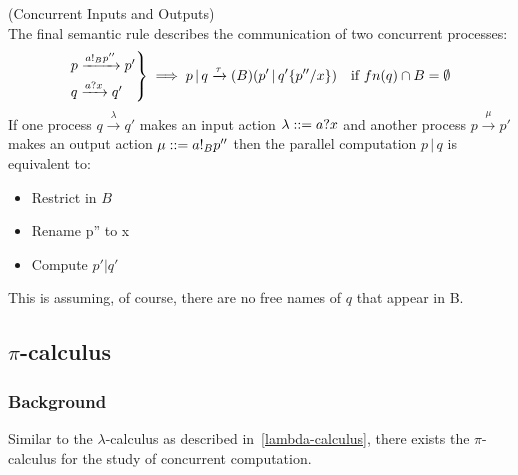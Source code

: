 \documentclass{article}
\begin{document}
        \begin{definition}{(Concurrent Inputs and Outputs)\\}
            The final semantic rule describes the communication of two concurrent processes:
            \begin{align}
                \begin{rcases}
                    p \xrightarrow{a!_{B} p''} p' \\
                    q \xrightarrow{a? x} q' \\
                \end{rcases}
                \implies p \, | \, q \xrightarrow{\tau} (B)(p' \, | \, q'\{p'' / x\}) \quad\text{if } fn(q) \cap B = \emptyset
            \end{align}
            If one process $q \xrightarrow{\lambda} q'$ makes an input action $\lambda ::= a?x$ and another process $p \xrightarrow{\mu} p'$ makes an output action $\mu ::= a!_{B} p''$ then the parallel computation $p \, | \, q$ is equivalent to:
            \begin{itemize}
                \item Restrict in $B$
                \item Rename p'' to x
                \item Compute $p' | q'$
            \end{itemize}
            This is assuming, of course, there are no free names of $q$ that appear in B.
        \end{definition}



    \subsection{$\pi$-calculus} \label{subsec:pi-calculus}

        \subsubsection{Background}
            \cite{pi-calculus}
            Similar to the $\lambda$-calculus as described in~\ref{lambda-calculus}, there exists the $\pi$-calculus for the study of concurrent computation.
    
\end{document}
